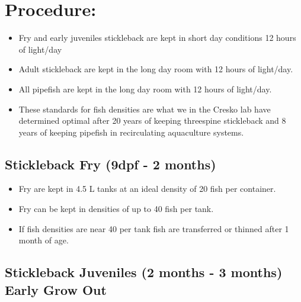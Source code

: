 \documentclass[
  letterpaper,
  DIV=11,
  numbers=noendperiod]{scrreprt}
\providecommand{\tightlist}{%
  \setlength{\itemsep}{0pt}\setlength{\parskip}{0pt}}\usepackage{longtable,booktabs,array}
\begin{document}
\hypertarget{procedure-48}{%
\section{Procedure:}\label{procedure-48}}

\begin{tcolorbox}[enhanced jigsaw, rightrule=.15mm, title=\textcolor{quarto-callout-note-color}{\faInfo}\hspace{0.5em}{NOTES}, titlerule=0mm, opacitybacktitle=0.6, toprule=.15mm, bottomrule=.15mm, opacityback=0, left=2mm, colframe=quarto-callout-note-color-frame, breakable, coltitle=black, colback=white, colbacktitle=quarto-callout-note-color!10!white, bottomtitle=1mm, leftrule=.75mm, toptitle=1mm, arc=.35mm]

\begin{itemize}
\tightlist
\item
  Fry and early juveniles stickleback are kept in short day conditions
  12 hours of light/day
\item
  Adult stickleback are kept in the long day room with 12 hours of
  light/day.
\item
  All pipefish are kept in the long day room with 12 hours of light/day.
\item
  These standards for fish densities are what we in the Cresko lab have
  determined optimal after 20 years of keeping threespine stickleback
  and 8 years of keeping pipefish in recirculating aquaculture systems.
\end{itemize}

\end{tcolorbox}

\hypertarget{stickleback-fry-9dpf---2-months}{%
\subsection{Stickleback Fry (9dpf - 2
months)}\label{stickleback-fry-9dpf---2-months}}

\begin{itemize}
\tightlist
\item
  Fry are kept in 4.5 L tanks at an ideal density of 20 fish per
  container.
\item
  Fry can be kept in densities of up to 40 fish per tank.
\item
  If fish densities are near 40 per tank fish are transferred or thinned
  after 1 month of age.
\end{itemize}

\hypertarget{stickleback-juveniles-2-months---3-months-early-grow-out}{%
\subsection{Stickleback Juveniles (2 months - 3 months) Early Grow
Out}\label{stickleback-juveniles-2-months---3-months-early-grow-out}}
\end{document}
